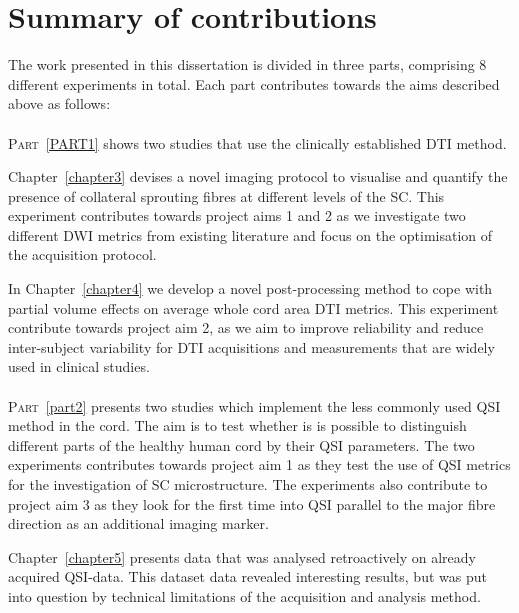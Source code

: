 \section{Summary of contributions}
The work presented in this dissertation is divided in three parts, comprising 8 different experiments in total. Each part contributes towards the aims described above as follows: 

\paragraph{}{\scshape{Part}}~\MakeTextUppercase{\ref{part1}} shows two studies that use the clinically established \gls{DTI} method. 


Chapter~\ref{chapter3} devises a novel imaging protocol to visualise and quantify the presence of collateral sprouting fibres at different levels of the \gls{SC}. This experiment contributes towards project aims 1 and 2 as we investigate two different \gls{DWI} metrics from existing literature and focus on the optimisation of the acquisition protocol.

In Chapter~\ref{chapter4} we develop a novel post-processing method to cope with partial volume effects on average whole cord area \gls{DTI} metrics. This experiment contribute towards project aim 2, as we aim to improve reliability and reduce inter-subject variability for \gls{DTI} acquisitions and measurements that are widely used in clinical studies. 

\paragraph{}{\scshape{Part}}~{\protect\ref{part2}} presents two studies which implement the less commonly used \gls{QSI} method in the cord. The aim is to test whether is is possible to distinguish different parts of the healthy human cord by their \gls{QSI} parameters. The two  experiments contributes towards project aim 1 as they test the use of \gls{QSI} metrics for the investigation of \gls{SC} microstructure. The experiments also contribute to project aim 3 as they look for the first time into \gls{QSI} parallel to the major fibre direction as an additional imaging marker.

Chapter~\ref{chapter5} presents data that was analysed retroactively on already acquired QSI-data. This dataset data revealed interesting results, but was put into question by technical limitations of the acquisition and analysis method. 

